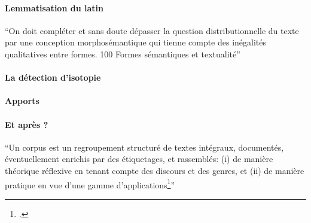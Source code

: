 \paragraph{Lemmatisation du latin}

\enquote{On doit compléter et sans doute dépasser la question distributionnelle du texte par une conception morphosémantique qui tienne compte des inégalités qualitatives entre formes. 100 Formes sémantiques et textualité}

\paragraph{La détection d'isotopie}

\paragraph{Apports}

\paragraph{Et après ?}

\enquote{Un corpus est un regroupement structuré de textes intégraux, documentés, éventuellement enrichis par des étiquetages, et rassemblés: (i) de manière théorique réflexive en tenant compte des discours et des genres, et (ii) de manière pratique en vue d’une gamme d’applications\footcite{rastier2005enjeux}}


